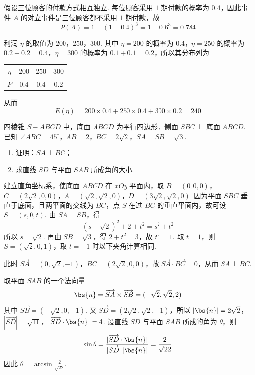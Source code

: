 \begin{solution}
假设三位顾客的付款方式相互独立. 每位顾客采用 \(1\) 期付款的概率为 \(0.4\)，因此事件 \(A\) 的对立事件是三位顾客都不采用 \(1\) 期付款，故
\[
P(A)=1-(1-0.4)^3=1-0.6^3=0.784
\]

利润 \(\eta\) 的取值为 \(200\)，\(250\)，\(300\). 其中 \(\eta=200\) 的概率为 \(0.4\)，\(\eta=250\) 的概率为 \(0.2+0.2=0.4\)，\(\eta=300\) 的概率为 \(0.1+0.1=0.2\)，所以其分布列为
\begin{center}
\begin{tabular}{c|ccc}
\(\eta\) & \(200\) & \(250\) & \(300\) \\
\hline
\(P\) & \(0.4\) & \(0.4\) & \(0.2\)
\end{tabular}
\end{center}
从而
\[
E(\eta)=200\times0.4+250\times0.4+300\times0.2=240
\]
\end{solution}

\begin{problem}
四棱锥 \(S-ABCD\) 中，底面 \(ABCD\) 为平行四边形，侧面 \(SBC \perp\) 底面 \(ABCD\). 已知 \(\angle ABC = 45^{\circ}\)，\(AB = 2\)，\(BC = 2\sqrt{2}\)，\(SA = SB = \sqrt{3}\).

\begin{enumerate}
\item 证明：\(SA \perp BC\)；
\item 求直线 \(SD\) 与平面 \(SAB\) 所成角的大小.
\end{enumerate}

\end{problem}

\begin{solution}
建立直角坐标系，使底面 \(ABCD\) 在 \(xOy\) 平面内，取
\(B=(0,0,0)\)，\(C=(2\sqrt2,0,0)\)，\(A=(\sqrt2,\sqrt2,0)\)，\(D=(3\sqrt2,\sqrt2,0)\).
因为平面 \(SBC\) 垂直于底面，且两平面的交线为 \(BC\)，点 \(S\) 在过 \(BC\) 的垂直平面内，故可设 \(S=(s,0,t)\). 由 \(SA=SB\)，得
\[
(s-\sqrt2)^2+2+t^2=s^2+t^2
\]
所以 \(s=\sqrt2\). 再由 \(SB=\sqrt3\)，得 \(2+t^2=3\)，故 \(t^2=1\). 取 \(t=1\)，则 \(S=(\sqrt2,0,1)\)，取 \(t=-1\) 时以下夹角计算相同.

此时 \(\overrightarrow{SA}=(0,\sqrt2,-1)\)，\(\overrightarrow{BC}=(2\sqrt2,0,0)\)，故 \(\overrightarrow{SA}\cdot\overrightarrow{BC}=0\)，从而 \(SA\perp BC\).

取平面 \(SAB\) 的一个法向量
\[
\bs{n}=\overrightarrow{SA}\times\overrightarrow{SB}=(-\sqrt2,\sqrt2,2)
\]
其中 \(\overrightarrow{SB}=(-\sqrt2,0,-1)\). 又 \(\overrightarrow{SD}=(2\sqrt2,\sqrt2,-1)\)，所以
\(|\bs{n}|=2\sqrt2\)，\(|\overrightarrow{SD}|=\sqrt{11}\)，\(\left|\overrightarrow{SD}\cdot\bs{n}\right|=4\).
设直线 \(SD\) 与平面 \(SAB\) 所成的角为 \(\theta\)，则
\[
\sin\theta=\frac{|\overrightarrow{SD}\cdot\bs{n}|}{|\overrightarrow{SD}|\,|\bs{n}|}=\frac{2}{\sqrt{22}}
\]
因此 \(\theta=\arcsin\frac{2}{\sqrt{22}}\).
\end{solution}

